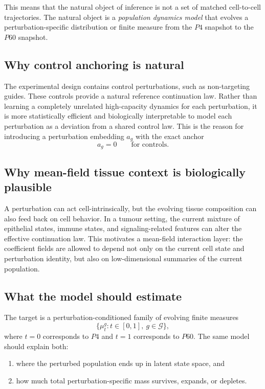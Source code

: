 \documentclass[11pt]{article}
\newcommand{\Gcal}{\mathcal{G}}
\begin{document}
This means that the natural object of inference is not a set of matched cell-to-cell trajectories. The natural object is a \emph{population dynamics model} that evolves a perturbation-specific distribution or finite measure from the $P4$ snapshot to the $P60$ snapshot.

\subsection{Why control anchoring is natural}

The experimental design contains control perturbations, such as non-targeting guides. These controls provide a natural reference continuation law. Rather than learning a completely unrelated high-capacity dynamics for each perturbation, it is more statistically efficient and biologically interpretable to model each perturbation as a deviation from a shared control law. This is the reason for introducing a perturbation embedding $a_g$ with the exact anchor
\[
a_g=0
\qquad \text{for controls.}
\]

\subsection{Why mean-field tissue context is biologically plausible}

A perturbation can act cell-intrinsically, but the evolving tissue composition can also feed back on cell behavior. In a tumour setting, the current mixture of epithelial states, immune states, and signaling-related features can alter the effective continuation law. This motivates a mean-field interaction layer: the coefficient fields are allowed to depend not only on the current cell state and perturbation identity, but also on low-dimensional summaries of the current population.

\subsection{What the model should estimate}

The target is a perturbation-conditioned family of evolving finite measures
\[
\Big\{ \mu_t^g : t\in[0,1],\ g\in\Gcal \Big\},
\]
where $t=0$ corresponds to $P4$ and $t=1$ corresponds to $P60$. The same model should explain both:
\begin{enumerate}[label=(\roman*),leftmargin=2.2em]
    \item where the perturbed population ends up in latent state space, and
    \item how much total perturbation-specific mass survives, expands, or depletes.
\end{enumerate}
\end{document}
